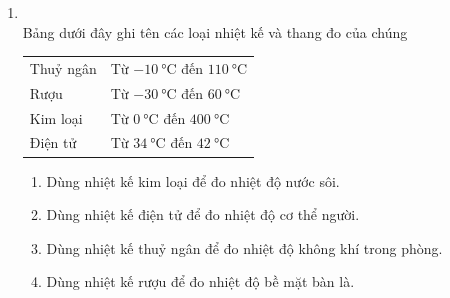 \begin{enumerate}[label=\bfseries Câu \arabic*:, leftmargin=1.7cm]
\item {}\\
Bảng dưới đây ghi tên các loại nhiệt kế và thang đo của chúng
\begin{center}
	\begin{tabular}{|C{5cm}|C{6cm}|}
		\hline
		 & \\
		\hline
		Thuỷ ngân & Từ $\SI{-10}{\celsius}$ đến $\SI{110}{\celsius}$\\
		\hline
		Rượu & Từ $\SI{-30}{\celsius}$ đến $\SI{60}{\celsius}$\\
		\hline
		Kim loại & Từ $\SI{0}{\celsius}$ đến $\SI{400}{\celsius}$\\
		\hline
		Điện tử & Từ $\SI{34}{\celsius}$ đến $\SI{42}{\celsius}$\\
		\hline
	\end{tabular}
\end{center}
\begin{enumerate}[label=\alph*)]
	\item Dùng nhiệt kế kim loại để đo nhiệt độ nước sôi.
	\item Dùng nhiệt kế điện tử để đo nhiệt độ cơ thể người.
	\item Dùng nhiệt kế thuỷ ngân để đo nhiệt độ không khí trong phòng.
	\item Dùng nhiệt kế rượu để đo nhiệt độ bề mặt bàn là.
\end{enumerate}


\end{enumerate}
